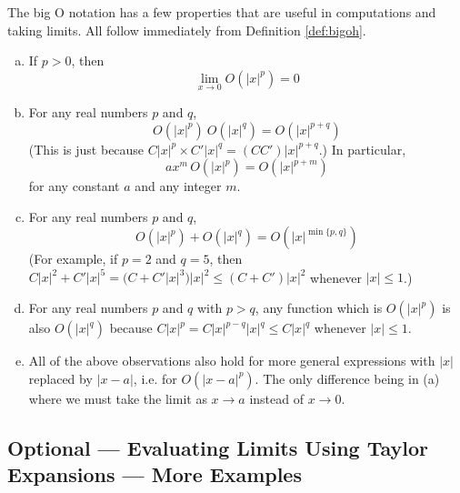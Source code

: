 \begin{remark}\label{rem:bigohppties}
The big O notation has a few properties that are useful in computations
and taking limits. All follow immediately from Definition \ref{def:bigoh}.
\begin{enumerate}[(a)]
\item If $p>0$, then
   \begin{equation*}
   \lim\limits_{x\rightarrow 0} O(|x|^p)=0
   \end{equation*}
\item For any real numbers $p$ and $q$,
     \begin{equation*}
     O(|x|^p)\  O(|x|^q)=O(|x|^{p+q})
     \end{equation*}
     (This is just because  $C|x|^p\times C'|x|^q= (CC')|x|^{p+q}$.)
     In particular,
     \begin{equation*}
     ax^m\,O(|x|^p)=O(|x|^{p+m})
     \end{equation*}
     for any constant $a$ and any integer $m$.
\item For any real numbers $p$ and $q$,
     \begin{equation*}
     O(|x|^p) + O(|x|^q)=O(|x|^{\min\{p,q\}})
     \end{equation*}
     (For example, if $p=2$ and $q=5$, then $C|x|^2+C'|x|^5
         =\big(C+C'|x|^3\big) |x|^2\le (C+C')|x|^2$
         whenever $|x|\le 1$.)
\item For any real numbers $p$ and $q$ with $p>q$, any function
which is $O(|x|^p)$ is also $O(|x|^q)$ because
$ C|x|^p= C|x|^{p-q}|x|^q\le C|x|^q$ whenever $|x|\le 1$.
\item All of the above observations also hold for more general expressions
with $|x|$ replaced by $|x-a|$, i.e. for $O(|x-a|^p)$. The only
difference being in (a) where we must take the limit as $x \to a$
instead of $x\to 0$.
\end{enumerate}
\end{remark}

\subsection{Optional --- Evaluating Limits Using Taylor Expansions --- More Examples}


